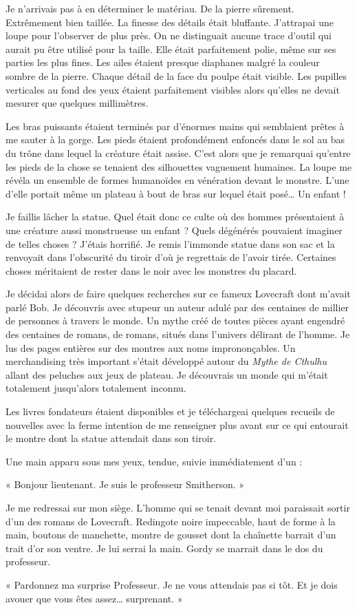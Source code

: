 Je n'arrivais pas à en déterminer le matériau. De la pierre sûrement. Extrêmement bien taillée. La finesse des détails
était bluffante. J'attrapai une loupe pour l'observer de plus près. On ne distinguait aucune trace d'outil qui aurait pu
être utilisé pour la taille. Elle était parfaitement polie, même sur ses parties les plus fines. Les ailes étaient
presque diaphanes malgré la couleur sombre de la pierre. Chaque détail de la face du poulpe était visible. Les pupilles
verticales au fond des yeux étaient parfaitement visibles alors qu'elles ne devait mesurer que quelques millimètres.

Les bras puissants étaient terminés par d'énormes mains qui semblaient prêtes à me sauter à la gorge. Les pieds étaient
profondément enfoncés dans le sol au bas du trône dans lequel la créature était assise. C'est alors que je remarquai
qu'entre les pieds de la chose se tenaient des silhouettes vaguement humaines. La loupe me révéla un ensemble de formes
humanoïdes en vénération devant le monstre. L'une d'elle portait même un plateau à bout de bras sur lequel était
posé\ldots{} Un enfant !

Je faillis lâcher la statue. Quel était donc ce culte où des hommes présentaient à une créature aussi monstrueuse un
enfant ? Quels dégénérés pouvaient imaginer de telles choses ? J'étais horrifié. Je remis l'immonde statue dans son sac
et la renvoyait dans l'obscurité du tiroir d'où je regrettais de l'avoir tirée. Certaines choses méritaient de rester
dans le noir avec les monstres du placard.

Je décidai alors de faire quelques recherches sur ce fameux Lovecraft dont m'avait parlé Bob. Je découvris avec stupeur
un auteur adulé par des centaines de millier de personnes à travers le monde. Un mythe créé de toutes pièces ayant
engendré des centaines de romans, de romans, situés dans l'univers délirant de l'homme. Je lus des pages entières sur
des montres aux noms imprononçables. Un merchandising très important s'était développé autour du \emph{Mythe de Cthulhu}
allant des peluches aux jeux de plateau. Je découvrais un monde qui m'était totalement jusqu'alors totalement inconnu.

Les livres fondateurs étaient disponibles et je téléchargeai quelques recueils de nouvelles avec la ferme intention de
me renseigner plus avant sur ce qui entourait le montre dont la statue attendait dans son tiroir.

Une main apparu sous mes yeux, tendue, suivie immédiatement d'un :

« Bonjour lieutenant. Je suis le professeur Smitherson. »

Je me redressai sur mon siège. L'homme qui se tenait devant moi paraissait sortir d'un des romans de Lovecraft.
Redingote noire impeccable, haut de forme à la main, boutons de manchette, montre de gousset dont la chaînette barrait
d'un trait d'or son ventre. Je lui serrai la main. Gordy se marrait dans le dos du professeur.

« Pardonnez ma surprise Professeur. Je ne vous attendais pas si tôt. Et je dois avouer que vous êtes assez\ldots{}
surprenant. »
